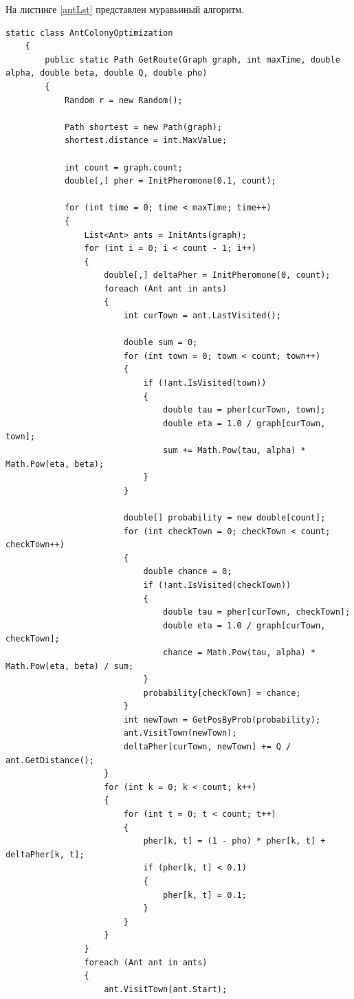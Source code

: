 \documentclass{article}
\begin{document}
	\indent На листинге \hyperref[antLst]{\ref{antLst}} представлен муравьиный алгоритм.
	\begin{lstlisting}[label=antLst,caption=Муравьиный алгоритм]
static class AntColonyOptimization
    {
        public static Path GetRoute(Graph graph, int maxTime, double alpha, double beta, double Q, double pho)
        {
            Random r = new Random();

            Path shortest = new Path(graph);
            shortest.distance = int.MaxValue;

            int count = graph.count;
            double[,] pher = InitPheromone(0.1, count);

            for (int time = 0; time < maxTime; time++)
            {
                List<Ant> ants = InitAnts(graph);
                for (int i = 0; i < count - 1; i++)
                {
                    double[,] deltaPher = InitPheromone(0, count);
                    foreach (Ant ant in ants)
                    {
                        int curTown = ant.LastVisited();

                        double sum = 0;
                        for (int town = 0; town < count; town++)
                        {
                            if (!ant.IsVisited(town))
                            {
                                double tau = pher[curTown, town];
                                double eta = 1.0 / graph[curTown, town];
                                sum += Math.Pow(tau, alpha) * Math.Pow(eta, beta);
                            }
                        }

                        double[] probability = new double[count];
                        for (int checkTown = 0; checkTown < count; checkTown++)
                        {
                            double chance = 0;
                            if (!ant.IsVisited(checkTown))
                            {
                                double tau = pher[curTown, checkTown];
                                double eta = 1.0 / graph[curTown, checkTown];
                                chance = Math.Pow(tau, alpha) * Math.Pow(eta, beta) / sum;
                            }
                            probability[checkTown] = chance;
                        }
                        int newTown = GetPosByProb(probability);
                        ant.VisitTown(newTown);
                        deltaPher[curTown, newTown] += Q / ant.GetDistance();
                    }
                    for (int k = 0; k < count; k++)
                    {
                        for (int t = 0; t < count; t++)
                        {
                            pher[k, t] = (1 - pho) * pher[k, t] + deltaPher[k, t];
                            if (pher[k, t] < 0.1)
                            {
                                pher[k, t] = 0.1;
                            }
                        }
                    }
                }
                foreach (Ant ant in ants)
                {
                    ant.VisitTown(ant.Start);


\end{lstlisting}
\end{document}
